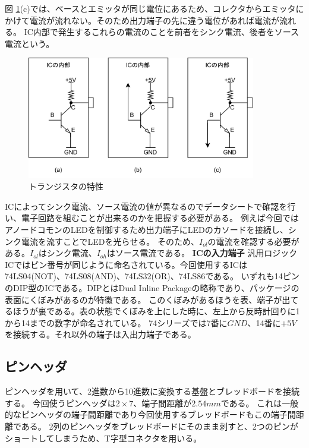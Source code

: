 \documentclass[a4paper,11pt,dvipdfmx]{jsarticle}
\begin{document}
図 \ref{fig:transistor}(c)では、ベースとエミッタが同じ電位にあるため、コレクタからエミッタにかけて電流が流れない。そのため出力端子の先に違う電位があれば電流が流れる。
IC内部で発生するこれらの電流のことを前者をシンク電流、後者をソース電流という。
\begin{figure}[h]
  \centering
  \includegraphics[width=10cm]{./images/trans.png}
  \caption{トランジスタの特性}
  \label{fig:transistor}
\end{figure}
ICによってシンク電流、ソース電流の値が異なるのでデータシートで確認を行い、電子回路を組むことが出来るのかを把握する必要がある。
例えば今回ではアノードコモンのLEDを制御するため出力端子にLEDのカソードを接続し、シンク電流を流すことでLEDを光らせる。
そのため、$I_{ol}$の電流を確認する必要がある。$I_{ol}$はシンク電流、$I_{oh}$はソース電流である。
\textbf{ICの入力端子}
汎用ロジックICではピン番号が同じように命名されている。今回使用するICは74LS04(NOT)、74LS08(AND)、74LS32(OR)、74LS86である。
いずれも14ピンのDIP型のICである。DIPとはDual Inline Packageの略称であり、パッケージの表面にくぼみがあるのが特徴である。
このくぼみがあるほうを表、端子が出てるほうが裏である。表の状態でくぼみを上にした時に、左上から反時計回りに1から14までの数字が命名されている。
74シリーズでは7番に$GND$、14番に$+5V$を接続する。それ以外の端子は入出力端子である。
\subsection{ピンヘッダ}
ピンヘッダを用いて、2進数から10進数に変換する基盤とブレッドボードを接続する。
今回使うピンヘッダは$2\times 7$、端子間距離が$2.54mm$である。
これは一般的なピンヘッダの端子間距離であり今回使用するブレッドボードもこの端子間距離である。
2列のピンヘッダをブレッドボードにそのまま刺すと、2つのピンがショートしてしまうため、T字型コネクタを用いる。
\end{document}
